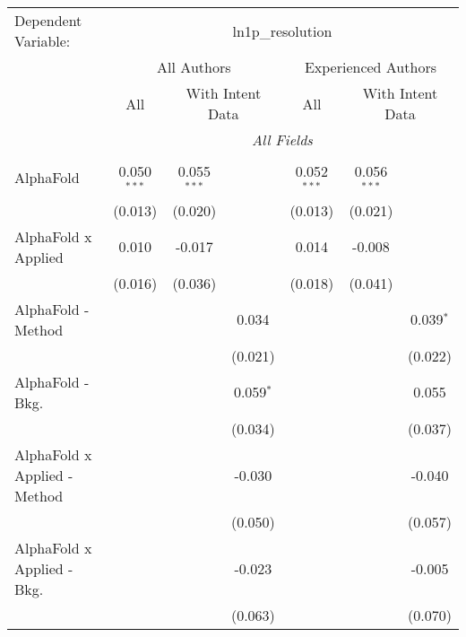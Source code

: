 \begingroup
\centering
\begin{tabular}{lcccccc}
   \tabularnewline \midrule \midrule
   Dependent Variable: & \multicolumn{6}{c}{ln1p\_resolution}\\
 & \multicolumn{3}{c}{All Authors} & \multicolumn{3}{c}{Experienced Authors} \\
\cmidrule(lr){2-4} \cmidrule(lr){5-7}
 & \multicolumn{1}{c}{All} & \multicolumn{2}{c}{With Intent Data} & \multicolumn{1}{c}{All} & \multicolumn{2}{c}{With Intent Data} \\
\cmidrule(lr){2-2} \cmidrule(lr){3-4} \cmidrule(lr){5-5} \cmidrule(lr){6-7}
 & \multicolumn{6}{c}{\textit{All Fields}} \\ \\
   AlphaFold                      & 0.050$^{***}$ & 0.055$^{***}$ &             & 0.052$^{***}$ & 0.056$^{***}$ &   \\   
                                  & (0.013)       & (0.020)       &             & (0.013)       & (0.021)       &   \\   
   AlphaFold x Applied            & 0.010         & -0.017        &             & 0.014         & -0.008        &   \\   
                                  & (0.016)       & (0.036)       &             & (0.018)       & (0.041)       &   \\   
   AlphaFold - Method             &               &               & 0.034       &               &               & 0.039$^{*}$\\   
                                  &               &               & (0.021)     &               &               & (0.022)\\   
   AlphaFold - Bkg.               &               &               & 0.059$^{*}$ &               &               & 0.055\\   
                                  &               &               & (0.034)     &               &               & (0.037)\\   
   AlphaFold x Applied - Method   &               &               & -0.030      &               &               & -0.040\\   
                                  &               &               & (0.050)     &               &               & (0.057)\\   
   AlphaFold x Applied - Bkg.     &               &               & -0.023      &               &               & -0.005\\   
                                  &               &               & (0.063)     &               &               & (0.070)\\   

\end{tabular}

